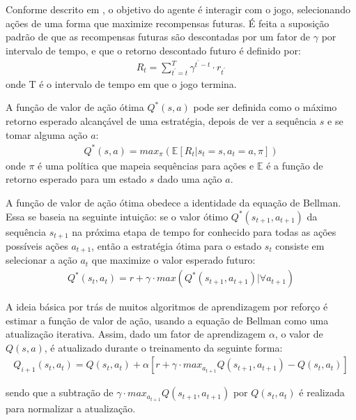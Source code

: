 Conforme descrito em \cite{play-atari-drl-deepmind}, o objetivo do agente é interagir com o jogo, selecionando ações de uma forma que maximize recompensas futuras. É feita a suposição padrão de que as recompensas futuras são descontadas por um fator de $\gamma$ por intervalo de tempo, e que o retorno descontado futuro é definido por: 
\begin{eqnarray}
	R_t=\sum_{t^{\prime}=t}^T \gamma^{t^{\prime}-t}\cdot r_{t^{\prime}}
\end{eqnarray}
onde T é o intervalo de tempo em que o jogo termina. 

A função de valor de ação ótima $Q^{*}(s, a)$ pode ser definida como o máximo retorno esperado alcançável de uma estratégia, depois de ver a sequência $s$ e se tomar alguma ação $a$:
\begin{eqnarray}
	Q^{*}(s, a)=max_\pi(\mathbb{E}[R_t | s_t=s,a_t=a,\pi])
\end{eqnarray}
onde $\pi$ é uma política que mapeia sequências para ações e $\mathbb{E}$ é a função de retorno esperado para um estado $s$ dado uma ação $a$.

A função de valor de ação ótima obedece a identidade da equação de Bellman. Essa se baseia na seguinte intuição: se o valor ótimo $Q^{*}(s_{t+1}, a_{t+1})$ da sequência $s_{t+1}$ na próxima etapa de tempo for conhecido para todas as ações possíveis ações $a_{t+1}$, então a estratégia ótima para o estado $s_t$ consiste em selecionar a ação $a_{t}$ que maximize o valor esperado futuro:
\begin{eqnarray}
	Q^{*}(s_t, a_t)= r + \gamma \cdot max(Q^{*}(s_{t+1},a_{t+1})|\forall a_{t+1})
  \label{eq:q_fun}
\end{eqnarray}

A ideia básica por trás de muitos algoritmos de aprendizagem por reforço é estimar a função de valor de ação, usando a equação de Bellman como uma atualização iterativa. Assim, dado um fator de aprendizagem $\alpha$, o valor de $Q(s,a)$, é atualizado durante o treinamento da seguinte forma:
\begin{eqnarray}
  Q_{i+1}(s_t,a_t) = Q(s_t,a_t) + \alpha[r + \gamma\cdot max_{a_{t+1}}Q(s_{t+1},a_{t+1}) - Q(s_t,a_t)]
  \label{eq:qlearning}
\end{eqnarray}

sendo que a subtração de $\gamma\cdot max_{a_{t+1}}Q(s_{t+1},a_{t+1})$ por $Q(s_t,a_t)$ é realizada para normalizar a atualização. 

